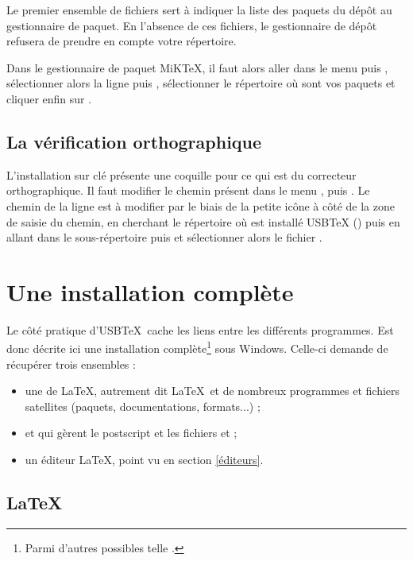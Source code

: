 Le premier ensemble de fichiers sert à indiquer la liste des paquets du dépôt au gestionnaire de paquet. En l'absence de ces fichiers, le gestionnaire de dépôt refusera de prendre en compte votre répertoire.

Dans le gestionnaire de paquet MiK\TeX, il faut alors aller dans le menu  puis , sélectionner alors la ligne  puis , sélectionner le répertoire où sont vos paquets et cliquer enfin sur .

\subsection{La vérification orthographique}

L'installation sur clé présente une coquille pour ce qui est du correcteur orthographique. Il faut modifier le chemin présent dans le menu ,  puis . Le chemin de la ligne  est à modifier par le biais de la petite icône à côté de la zone de saisie du chemin, en cherchant le répertoire où est installé USBTeX () puis en allant dans le sous-répertoire  puis  et sélectionner alors le fichier . 

\section{Une installation complète}

Le côté pratique d'USB\TeX\ cache les liens entre les différents programmes. Est donc décrite ici une installation complète\footnote{Parmi d'autres possibles telle .} sous Windows. Celle-ci demande de récupérer trois ensembles :
\begin{itemize}
\item une  de \LaTeX, autrement dit \LaTeX\ et de nombreux programmes et fichiers satellites (paquets, documentations, formats...) ;
\item {} et  qui gèrent le postscript et les fichiers  et  ;
\item un éditeur \LaTeX, point vu en section \ref{éditeurs}.
\end{itemize}

\subsection{\LaTeX}

